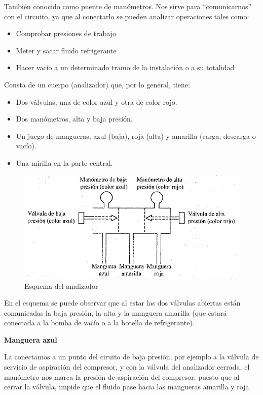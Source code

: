 Tambi\'en conocido como puente de man\'ometros. Nos sirve para ``comunicarnos'' con el circuito, ya que al conectarlo se pueden analizar operaciones tales como: 

\begin{itemize}
    \item Comprobar presiones de trabajo
    \item Meter y sacar fluido refrigerante
    \item Hacer vac\'io a un determinado tramo de la instalaci\'on o a su totalidad
\end{itemize}

Consta de un cuerpo (analizador) que, por lo general, tiene:

\begin{itemize}
    \item Dos v\'alvulas, una de color azul y otra de color rojo.
    \item Dos man\'ometros, alta y baja presi\'on.
    \item Un juego de mangueras, azul (baja), roja (alta) y amarilla (carga, descarga o vac\'io).
    \item Una mirilla en la parte central.
\end{itemize}

\begin{figure}[H]
    \centering
    \includegraphics[width=.6\linewidth]{figuras/control-seguridad/analizador-partes.png}
    \caption{Esquema del analizador}
    \label{fig:esquema-analizador}
\end{figure}

En el esquema se puede observar que al estar las dos v\'alvulas abiertas est\'an comunicadas la baja presi\'on, la alta y la manguera amarilla (que estar\'a conectada a la bomba de vac\'io o a la botella de refrigerante).

\textbf{Manguera azul}

La conectamos a un punto del ciruito de baja presi\'on, por ejemplo a la v\'alvula de servicio de aspiraci\'on del compresor, y con la v\'alvula del analizador cerrada, el man\'ometro nos marca la presi\'on de aspiraci\'on del compresor, puesto que al cerrar la v\'alvula, impide que el fluido pase hacia las mangueras amarilla y roja.

